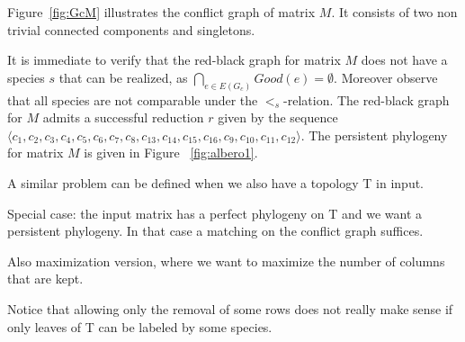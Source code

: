 Figure~\ref{fig:GcM} illustrates the conflict graph of matrix $M$. It consists
of two non trivial connected components and singletons.

It is immediate to verify that the red-black graph for matrix $M$ does not have
a species $s$ that can be realized, as  $\bigcap_{e \in E(G_c)}Good(e) =
\emptyset$.
Moreover observe that all species are not comparable under the $<_s$-relation.
The red-black graph  for $M$   admits a successful reduction   $r $ given by
the sequence $\langle c_1, c_2, c_3, c_4, c_5, c_6, c_7, c_8, c_{13}, c_{14},
c_{15}, c_{16}, c_9, c_{10}, c_{11}, c_{12} \rangle$.
The persistent phylogeny for matrix $M$ is given in Figure ~\ref{fig:albero1}.



A similar problem can be defined when we also have a topology T in input.

Special case: the input matrix has a perfect phylogeny on T and we want a persistent phylogeny. In that case a matching on the conflict graph suffices.

Also maximization version, where we want to maximize the number of columns that are kept.

Notice that allowing only the removal of some rows does not really make sense if only leaves of T can be labeled by some species.






